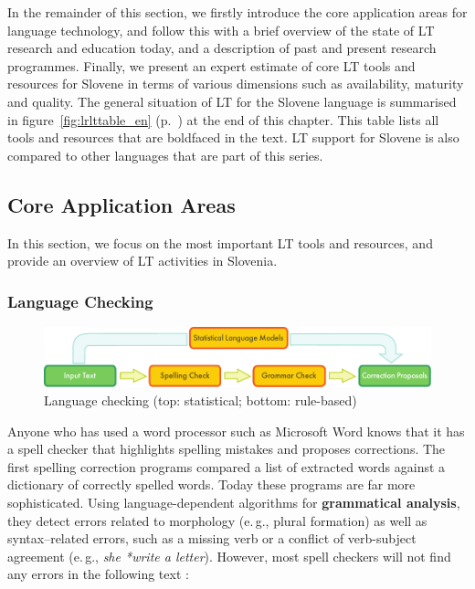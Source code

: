 \begin{multicols}{2}
In the remainder of this section, we firstly introduce the core application areas for language technology, and follow this with a brief overview of the state of LT research and education today, and a description of past and present research programmes. Finally, we present an expert estimate of core LT tools and resources for Slovene in terms of various dimensions such as availability, maturity and quality. The general situation of LT for the Slovene language is summarised in figure~\ref{fig:lrlttable_en} (p.~\pageref{fig:lrlttable_en}) at the end of this chapter. This table lists all tools and resources that are boldfaced in the text. LT support for Slovene is also compared to other languages that are part of this series.

\subsection{Core Application Areas}

In this section, we focus on the most important LT tools and resources, and provide an overview of LT activities in Slovenia. 

\subsubsection{Language Checking}

\begin{figure}[t!]
  \center
  \includegraphics[width=\textwidth]{../_media/english/language_checking}
  \caption{Language checking (top: statistical; bottom: rule-based)}
  \label{fig:langcheckingaarch_en}
\end{figure}

Anyone who has used a word processor such as Microsoft Word knows that it has a spell checker that highlights spelling mistakes and proposes corrections. The first spelling correction programs compared a list of extracted words against a dictionary of correctly spelled words. Today these programs are far more sophisticated. Using language-dependent algorithms for \textbf{grammatical analysis}, they detect errors related to morphology (e.\,g., plural formation) as well as syntax–related errors, such as a missing verb or a conflict of verb-subject agreement (e.\,g., \textit{she *write a letter}). However, most spell checkers will not find any errors in the following text \cite{zar1}:


\end{multicols}
